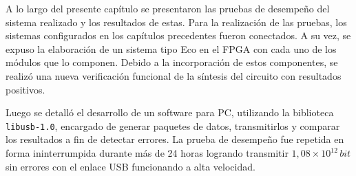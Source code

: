A lo largo del presente capítulo se presentaron las pruebas de desempeño del sistema realizado y los resultados de estas. Para la realización de las pruebas, los sistemas configurados en los capítulos precedentes fueron conectados. A su vez, se expuso la elaboración de un sistema tipo Eco en el FPGA con cada uno de los módulos que lo componen. Debido a la incorporación de estos componentes, se realizó una nueva verificación funcional de la síntesis del circuito con resultados positivos.

Luego se detalló el desarrollo de un software para PC, utilizando la biblioteca \verb|libusb-1.0|, encargado de generar paquetes de datos, transmitirlos y comparar los resultados a fin de detectar errores. La prueba de desempeño fue repetida en forma ininterrumpida durante más de 24 horas logrando transmitir $1,08\times10^{12}\,bit$ sin errores con el enlace USB funcionando a alta velocidad. 